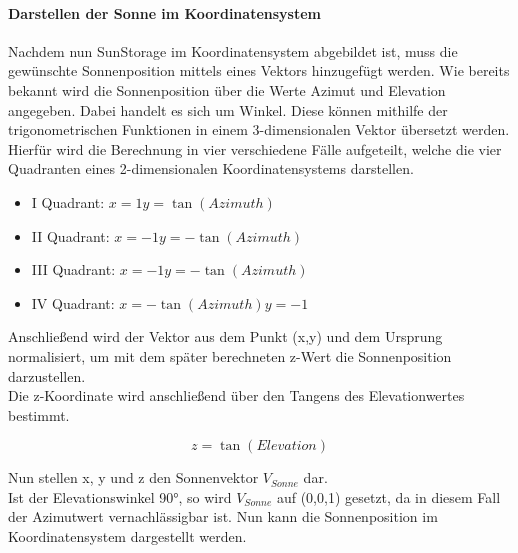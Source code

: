 \paragraph{Darstellen der Sonne im Koordinatensystem}
Nachdem nun SunStorage im Koordinatensystem abgebildet ist, muss die gewünschte Sonnenposition mittels eines Vektors hinzugefügt werden.
Wie bereits bekannt wird die Sonnenposition über die Werte Azimut und Elevation angegeben. 
Dabei handelt es sich um Winkel. 
Diese können mithilfe der trigonometrischen Funktionen in einem 3-dimensionalen Vektor übersetzt werden.
Hierfür wird die Berechnung in vier verschiedene Fälle aufgeteilt, welche die vier Quadranten eines 2-dimensionalen Koordinatensystems darstellen. 
\begin{itemize}
    \item I Quadrant: $x = 1 y = \tan(Azimuth)$
    \item II Quadrant: $x = -1 y = -\tan(Azimuth)$
    \item III Quadrant: $x = -1 y = -\tan(Azimuth)$
    \item IV Quadrant: $x = -\tan(Azimuth) y = -1$
\end{itemize}
Anschließend wird der Vektor aus dem Punkt (x,y) und dem Ursprung normalisiert, um mit dem später berechneten z-Wert die Sonnenposition darzustellen.\\
Die z-Koordinate wird anschließend über den Tangens des Elevationwertes bestimmt. 

$$ z = \tan(Elevation) $$

Nun stellen x, y und z den Sonnenvektor $ V_{Sonne} $ dar.\\
Ist der Elevationswinkel 90°, so wird $ V_{Sonne} $ auf (0,0,1) gesetzt, da in diesem Fall der Azimutwert vernachlässigbar ist.
Nun kann die Sonnenposition im Koordinatensystem dargestellt werden.

